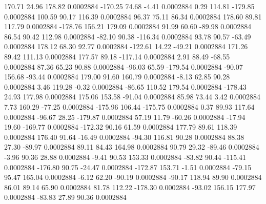       170.71       24.96      178.82     0.0002884
     -170.25       74.68       -4.41     0.0002884
        0.29      114.81     -179.85     0.0002884
      100.59       90.17      116.39     0.0002884
       96.37       75.11       86.34     0.0002884
      178.60       89.81      117.79     0.0002884
     -178.76      156.21      179.09     0.0002884
       91.99       60.60      -89.98     0.0002884
       86.54       90.42      112.98     0.0002884
      -82.10       90.38     -116.34     0.0002884
       93.78       90.57      -63.49     0.0002884
      178.12       68.30       92.77     0.0002884
     -122.61       14.22      -49.21     0.0002884
      171.26       89.42      111.13     0.0002884
      177.57       89.18     -117.14     0.0002884
        2.91       88.49      -68.55     0.0002884
       87.36       65.23       90.88     0.0002884
      -96.03       65.59     -179.54     0.0002884
      -90.07      156.68      -93.44     0.0002884
      179.00       91.60      160.79     0.0002884
       -8.13       62.85       90.28     0.0002884
        3.46      119.28       -0.32     0.0002884
      -86.65      110.52      179.54     0.0002884
     -178.43       24.93      177.98     0.0002884
      175.06      153.58      -91.04     0.0002884
       85.98       73.44        3.42     0.0002884
        7.73      160.29      -77.25     0.0002884
     -175.96      106.44     -175.75     0.0002884
        0.37       89.93      117.64     0.0002884
      -96.67       28.25     -179.87     0.0002884
       57.19       11.79      -60.26     0.0002884
      -17.94       19.60     -169.77     0.0002884
     -172.32       90.16       61.59     0.0002884
      177.79       89.61      118.39     0.0002884
      176.40       91.64      -16.49     0.0002884
      -94.30      116.81       90.28     0.0002884
       88.38       27.30      -89.97     0.0002884
       89.11       84.43      164.98     0.0002884
       90.79       29.32      -89.46     0.0002884
       -3.96       90.36       28.88     0.0002884
       -9.41       90.53      153.33     0.0002884
      -83.82       90.44     -115.41     0.0002884
     -176.80       90.75      -24.47     0.0002884
     -172.87      153.71       -1.51     0.0002884
      -79.15       95.47      165.04     0.0002884
       -6.12       62.20      -90.19     0.0002884
      -90.17      118.94       89.90     0.0002884
       86.01       89.14       65.90     0.0002884
       81.78      112.22     -178.30     0.0002884
      -93.02      156.15      177.97     0.0002884
      -83.83       27.89       90.36     0.0002884
